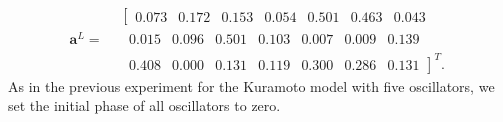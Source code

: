 \documentclass{article}
\begin{document}
\begin{equation}\label{L7}
\mathbf{a}^L =
\!\begin{aligned}
&
\left[\begin{matrix}
  0.073 & 0.172 & 0.153 & 0.054 & 0.501 & 0.463 & 0.043
\end{matrix}\right.\\[-2pt]
&\ 
\left.\begin{matrix}
  0.015 & 0.096 & 0.501 & 0.103 & 0.007 & 0.009 & 0.139
\end{matrix}\right.\\[-4pt]
&\ 
\left.\begin{matrix}
  0.408 & 0.000 & 0.131 & 0.119 & 0.300 & 0.286 & 0.131
\end{matrix}\right]^T.
\end{aligned}
\end{equation}
As in the previous experiment for the Kuramoto model with five oscillators, we set the initial phase of all oscillators to zero.
\end{document}
